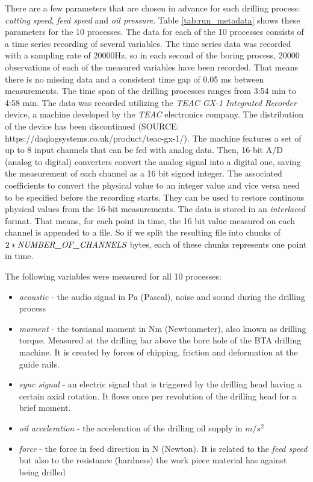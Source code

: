 \documentclass[12 pt]{scrartcl}
\begin{document}
There are a few parameters that are chosen in advance for each drilling process: \emph{cutting speed}, \emph{feed speed} and \emph{oil pressure}. Table \ref{tab:run_metadata} shows these parameters for the 10 processes.
The data for each of the 10 processes consists of a time series recording of several variables.
The time series data was recorded with a sampling rate of 20000Hz, so in each second of the boring process, 20000 observations of each of the measured variables have been recorded. That means there is no missing data and a consistent time gap of 0.05 ms between measurements. The time span of the drilling processes ranges from 3:54 min to 4:58 min.
The data was recorded utilizing the \emph{TEAC GX-1 Integrated Recorder} device, a machine developed by the \emph{TEAC} electronics company. The distribution of the device has been discontinued (SOURCE: https://daqlogsystems.co.uk/product/teac-gx-1/). The machine features a set of up to 8 input channels that can be fed with analog data.
Then, 16-bit A/D (analog to digital) converters convert the analog signal into a digital one, saving the measurement of each channel as a 16 bit signed integer.
The associated coefficients to convert the physical value to an integer value and vice versa need to be specified before the recording starts. They can be used to restore continous physical values from the 16-bit measurements. The data is stored in an \emph{interlaced} format. That means, for each point in time, the 16 bit value measured on each channel is appended to a file. So if we split the resulting file into chunks of $2*\emph{NUMBER\_OF\_CHANNELS}$ bytes, each of these chunks represents one point in time.

The following variables were measured for all 10 processes:
\begin{itemize}
  \item \emph{acoustic} - the audio signal in Pa (Pascal), noise and sound during the drilling process
  \item \emph{moment} - the torsianal moment in Nm (Newtonmeter), also known as drilling torque. Measured at the drilling bar above the bore hole of the BTA drilling machine. It is created by forces of chipping, friction and deformation at the guide rails.
  \item \emph{sync signal} - an electric signal that is triggered by the drilling head having a certain axial rotation. It flows once per revolution of the drilling head for a brief moment.
  \item \emph{oil acceleration} - the acceleration of the drilling oil supply in $m/s^2$
  \item \emph{force} - the force in feed direction in N (Newton). It is related to the \emph{feed speed} but also to the resistance (hardness) the work piece material has against being drilled
\end{itemize}
\end{document}
